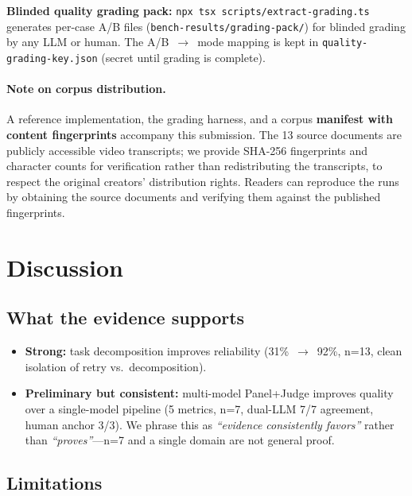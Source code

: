 \documentclass[11pt]{article}
\begin{document}
\textbf{Blinded quality grading pack:} \verb|npx tsx scripts/extract-grading.ts|
generates per-case A/B files (\texttt{bench-results/grading-pack/}) for blinded
grading by any LLM or human. The A/B~$\rightarrow$~mode mapping is kept in
\texttt{quality-grading-key.json} (secret until grading is complete).

\paragraph{Note on corpus distribution.} A reference implementation, the grading
harness, and a corpus \textbf{manifest with content fingerprints} accompany this
submission. The 13 source documents are publicly accessible video transcripts;
we provide SHA-256 fingerprints and character counts for verification rather
than redistributing the transcripts, to respect the original creators'
distribution rights. Readers can reproduce the runs by obtaining the source
documents and verifying them against the published fingerprints.

\section{Discussion}
\label{sec:discussion}

\subsection{What the evidence supports}

\begin{itemize}
  \item \textbf{Strong:} task decomposition improves reliability (31\%~$\rightarrow$~92\%,
        n=13, clean isolation of retry vs.\ decomposition).
  \item \textbf{Preliminary but consistent:} multi-model Panel+Judge improves
        quality over a single-model pipeline (5 metrics, n=7, dual-LLM 7/7
        agreement, human anchor 3/3). We phrase this as \emph{``evidence
        consistently favors''} rather than \emph{``proves''}---n=7 and a single
        domain are not general proof.
\end{itemize}

\subsection{Limitations}
\end{document}
